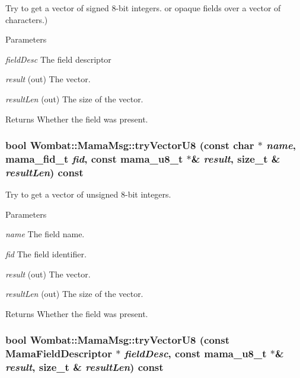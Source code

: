 Try to get a vector of signed 8-\/bit integers. or opaque fields over a vector of characters.) 
\begin{DoxyParams}{Parameters}
\item[{\em fieldDesc}]The field descriptor \item[{\em result}](out) The vector. \item[{\em resultLen}](out) The size of the vector. \end{DoxyParams}
\begin{DoxyReturn}{Returns}
Whether the field was present. 
\end{DoxyReturn}
\hypertarget{classWombat_1_1MamaMsg_a34641cb35966312142cf25c4bba6188f}{
\subsubsection[{tryVectorU8}]{\setlength{\rightskip}{0pt plus 5cm}bool Wombat::MamaMsg::tryVectorU8 (const char $\ast$ {\em name}, \/  mama\_\-fid\_\-t {\em fid}, \/  const mama\_\-u8\_\-t $\ast$\& {\em result}, \/  size\_\-t \& {\em resultLen}) const}}
\label{classWombat_1_1MamaMsg_a34641cb35966312142cf25c4bba6188f}


Try to get a vector of unsigned 8-\/bit integers. 
\begin{DoxyParams}{Parameters}
\item[{\em name}]The field name. \item[{\em fid}]The field identifier. \item[{\em result}](out) The vector. \item[{\em resultLen}](out) The size of the vector. \end{DoxyParams}
\begin{DoxyReturn}{Returns}
Whether the field was present. 
\end{DoxyReturn}
\hypertarget{classWombat_1_1MamaMsg_a8de5381c1492984e0c7cd8435778a56e}{
\subsubsection[{tryVectorU8}]{\setlength{\rightskip}{0pt plus 5cm}bool Wombat::MamaMsg::tryVectorU8 (const {\bf MamaFieldDescriptor} $\ast$ {\em fieldDesc}, \/  const mama\_\-u8\_\-t $\ast$\& {\em result}, \/  size\_\-t \& {\em resultLen}) const}}
\label{classWombat_1_1MamaMsg_a8de5381c1492984e0c7cd8435778a56e}


